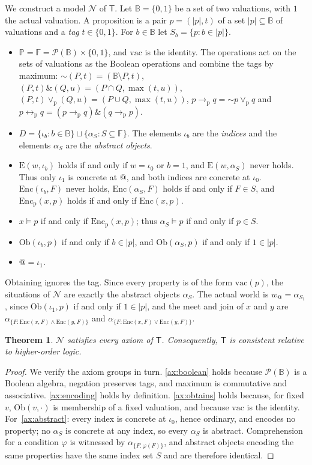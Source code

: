 \documentclass[11pt]{amsart}
\makeatletter
\theoremstyle{plain}
\newtheorem{theorem}{Theorem}[section]
\theoremstyle{definition}
\theoremstyle{remark}
\newcommand{\at}{@}
\newcommand{\aw}{w_{\at}}
\newcommand{\Enc}{\mathrm{Enc}}
\newcommand{\Encp}{\mathrm{Enc}_{\mathrm{p}}}
\newcommand{\Obt}{\mathrm{Ob}}
\newcommand{\Conc}{\mathrm{E}}
\newcommand{\VAC}{\mathrm{vac}}
\newcommand{\Prop}{\mathbb{P}}
\newcommand{\Pty}{\mathbb{F}}
\newcommand{\Dom}{D}
\newcommand{\T}{\mathsf{T}}
\newcommand{\N}{\mathcal{N}}
\newcommand{\pneg}{\mathord{\sim}}
\newcommand{\pand}{\mathbin{\&}}
\newcommand{\por}{\mathbin{\vee_{\mathrm{p}}}}
\newcommand{\pimp}{\mathbin{\to_{\mathrm{p}}}}
\newcommand{\piff}{\mathbin{\leftrightarrow_{\mathrm{p}}}}
\makeatother
\begin{document}
We construct a model $\N$ of $\T$. Let $\mathbb{B} = \{0,1\}$ be a set
of two valuations, with $1$ the actual valuation. A proposition is a
pair $p = (|p|, t)$ of a set $|p| \subseteq \mathbb{B}$ of valuations
and a \emph{tag} $t \in \{0,1\}$. For $b \in \mathbb{B}$ let
$S_b = \{p : b \in |p|\}$.
\begin{itemize}
\item $\Prop = \Pty = \mathcal{P}(\mathbb{B}) \times \{0,1\}$, and
  $\VAC$ is the identity. The operations act on the sets of valuations
  as the Boolean operations and combine the tags by maximum:
  $\pneg(P,t) = (\mathbb{B} \setminus P, t)$,
  $(P,t) \pand (Q,u) = (P \cap Q, \max(t,u))$,
  $(P,t) \por (Q,u) = (P \cup Q, \max(t,u))$,
  $p \pimp q = \pneg p \por q$ and
  $p \piff q = (p \pimp q) \pand (q \pimp p)$.
\item $\Dom = \{\iota_b : b \in \mathbb{B}\} \sqcup
  \{\alpha_S : S \subseteq \Pty\}$. The elements $\iota_b$ are the
  \emph{indices} and the elements $\alpha_S$ are the \emph{abstract
  objects}.
\item $\Conc(w,\iota_b)$ holds if and only if $w = \iota_0$ or
  $b = 1$, and $\Conc(w,\alpha_S)$ never holds. Thus only $\iota_1$
  is concrete at $\at$, and both indices are concrete at $\iota_0$.
  $\Enc(\iota_b, F)$ never holds, $\Enc(\alpha_S, F)$ holds if and only
  if $F \in S$, and $\Encp(x,p)$ holds if and only if $\Enc(x,p)$.
\item $x \models p$ if and only if $\Encp(x,p)$; thus
  $\alpha_S \models p$ if and only if $p \in S$.
\item $\Obt(\iota_b, p)$ if and only if $b \in |p|$, and
  $\Obt(\alpha_S, p)$ if and only if $1 \in |p|$.
\item $\at = \iota_1$.
\end{itemize}
Obtaining ignores the tag. Since every property is of the form
$\VAC(p)$, the situations of $\N$ are exactly the abstract objects
$\alpha_S$. The actual world is $\aw = \alpha_{S_1}$, since
$\Obt(\iota_1, p)$ if and only if $1 \in |p|$, and the meet and join of
$x$ and $y$ are $\alpha_{\{F : \Enc(x,F) \wedge \Enc(y,F)\}}$ and
$\alpha_{\{F : \Enc(x,F) \vee \Enc(y,F)\}}$.

\begin{theorem}
\label{thm:model}
$\N$ satisfies every axiom of $\T$. Consequently, $\T$ is consistent
relative to higher-order logic.
\end{theorem}

\begin{proof}
We verify the axiom groups in turn.
\ref{ax:boolean} holds because $\mathcal{P}(\mathbb{B})$ is a Boolean
algebra, negation preserves tags, and maximum is commutative and
associative.
\ref{ax:encoding} holds by definition.
\ref{ax:obtains} holds because, for fixed $v$, $\Obt(v,\cdot)$ is
membership of a fixed valuation, and because $\VAC$ is the identity.
For~\ref{ax:abstract}: every index is concrete at $\iota_0$, hence
ordinary, and encodes no property; no $\alpha_S$ is concrete at any
index, so every $\alpha_S$ is abstract. Comprehension for a condition
$\varphi$ is witnessed by $\alpha_{\{F : \varphi(F)\}}$, and abstract
objects encoding the same properties have the same index set $S$ and
are therefore identical.
\end{proof}
\end{document}
